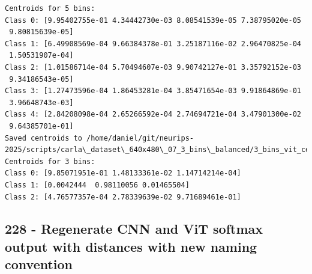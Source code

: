 \begin{verbatim}
Centroids for 5 bins:
Class 0: [9.95402755e-01 4.34442730e-03 8.08541539e-05 7.38795020e-05
 9.80815639e-05]
Class 1: [6.49908569e-04 9.66384378e-01 3.25187116e-02 2.96470825e-04
 1.50531907e-04]
Class 2: [1.01586714e-04 5.70494607e-03 9.90742127e-01 3.35792152e-03
 9.34186543e-05]
Class 3: [1.27473596e-04 1.86453281e-04 3.85471654e-03 9.91864869e-01
 3.96648743e-03]
Class 4: [2.84208098e-04 2.65266592e-04 2.74694721e-04 3.47901300e-02
 9.64385701e-01]
Saved centroids to /home/daniel/git/neurips-2025/scripts/carla\_dataset\_640x480\_07_3_bins\_balanced/3_bins_vit_centroids\_balanced.npy
Centroids for 3 bins:
Class 0: [9.85071951e-01 1.48133361e-02 1.14714214e-04]
Class 1: [0.0042444  0.98110056 0.01465504]
Class 2: [4.76577357e-04 2.78339639e-02 9.71689461e-01]

\end{verbatim}

\subsection{228 - Regenerate CNN and ViT softmax output with distances with new naming convention}
\label{app_res:228}

